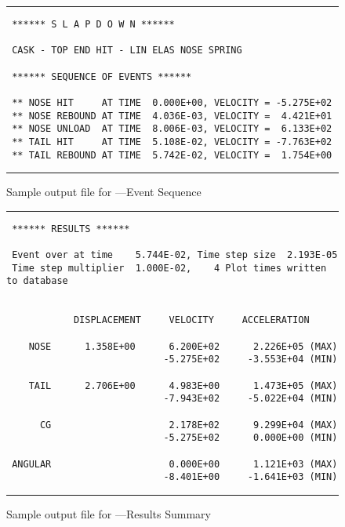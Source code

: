 \begin{figure}
\parskip0pt
\hrule\small
\begin{verbatim}
 ****** S L A P D O W N ******

 CASK - TOP END HIT - LIN ELAS NOSE SPRING

 ****** SEQUENCE OF EVENTS ******

 ** NOSE HIT     AT TIME  0.000E+00, VELOCITY = -5.275E+02
 ** NOSE REBOUND AT TIME  4.036E-03, VELOCITY =  4.421E+01
 ** NOSE UNLOAD  AT TIME  8.006E-03, VELOCITY =  6.133E+02
 ** TAIL HIT     AT TIME  5.108E-02, VELOCITY = -7.763E+02
 ** TAIL REBOUND AT TIME  5.742E-02, VELOCITY =  1.754E+00
\end{verbatim}
\hrule
\caption{Sample output file for \SLAP---Event Sequence}\label{sampout3}
\end{figure}
\begin{figure}
\parskip0pt
\hrule\small
\begin{verbatim}
 ****** RESULTS ******

 Event over at time    5.744E-02, Time step size  2.193E-05
 Time step multiplier  1.000E-02,    4 Plot times written to database


            DISPLACEMENT     VELOCITY     ACCELERATION

    NOSE      1.358E+00      6.200E+02      2.226E+05 (MAX)
                            -5.275E+02     -3.553E+04 (MIN)

    TAIL      2.706E+00      4.983E+00      1.473E+05 (MAX)
                            -7.943E+02     -5.022E+04 (MIN)

      CG                     2.178E+02      9.299E+04 (MAX)
                            -5.275E+02      0.000E+00 (MIN)

 ANGULAR                     0.000E+00      1.121E+03 (MAX)
                            -8.401E+00     -1.641E+03 (MIN)
\end{verbatim}
\hrule
\caption{Sample output file for \SLAP---Results Summary}\label{sampout4}
\end{figure}
